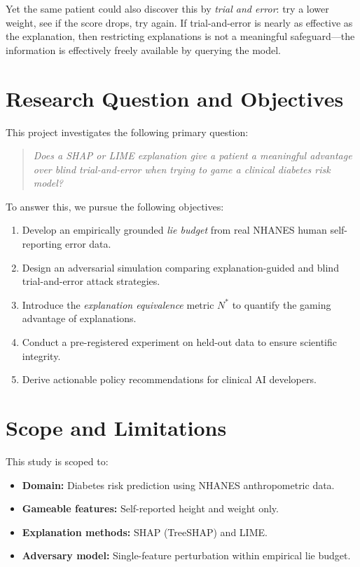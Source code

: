 \documentclass[12pt, a4paper, oneside]{report}
\theoremstyle{definition}
\begin{document}
Yet the same patient could also discover this by \textit{trial and error}:
try a lower weight, see if the score drops, try again. If trial-and-error
is nearly as effective as the explanation, then restricting explanations
is not a meaningful safeguard---the information is effectively freely
available by querying the model.

\section{Research Question and Objectives}

This project investigates the following primary question:

\begin{quote}
  \textit{Does a SHAP or LIME explanation give a patient a meaningful advantage
  over blind trial-and-error when trying to game a clinical diabetes risk model?}
\end{quote}

To answer this, we pursue the following objectives:
\begin{enumerate}
  \item Develop an empirically grounded \textit{lie budget} from real NHANES
        human self-reporting error data.
  \item Design an adversarial simulation comparing explanation-guided and
        blind trial-and-error attack strategies.
  \item Introduce the \textit{explanation equivalence} metric $N^*$ to quantify
        the gaming advantage of explanations.
  \item Conduct a pre-registered experiment on held-out data to ensure
        scientific integrity.
  \item Derive actionable policy recommendations for clinical AI developers.
\end{enumerate}

\section{Scope and Limitations}

This study is scoped to:
\begin{itemize}
  \item \textbf{Domain:} Diabetes risk prediction using NHANES anthropometric data.
  \item \textbf{Gameable features:} Self-reported height and weight only.
  \item \textbf{Explanation methods:} SHAP (TreeSHAP) and LIME.
  \item \textbf{Adversary model:} Single-feature perturbation within empirical lie budget.
\end{itemize}
\end{document}
